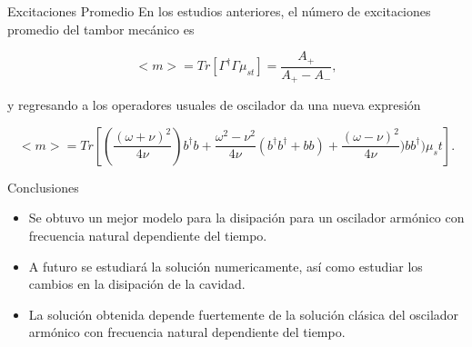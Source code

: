 \documentclass[10pt]{beamer}
\begin{document}
\begin{frame}{Excitaciones Promedio}
En los estudios anteriores, el número de excitaciones promedio del tambor mecánico es

\begin{equation*}
<m> = Tr[\Gamma^\dagger \Gamma \mu_{st}] = \frac{A_+}{A_+ - A_-},
\end{equation*}

y regresando a los operadores usuales de oscilador da una nueva expresión

\begin{equation*}
<m> = Tr[(\frac{(\omega + \nu )^2}{4\nu})b^\dagger b +\frac{\omega^2 - \nu^2}{4\nu}(b^\dagger b^\dagger +bb) +\frac{(\omega - \nu )^2}{4\nu}) b b^\dagger)\mu_st].
\end{equation*}

\end{frame}

\begin{frame}{Conclusiones}

\begin{itemize}
\item Se obtuvo un mejor modelo para la disipación para un oscilador armónico con frecuencia natural dependiente del tiempo.

\item A futuro se estudiará la solución numericamente, así como estudiar los cambios en la disipación de la cavidad.

\item La solución obtenida depende fuertemente de la solución clásica del oscilador armónico con frecuencia natural dependiente del tiempo.
\end{itemize}


\end{frame}
\end{document}
